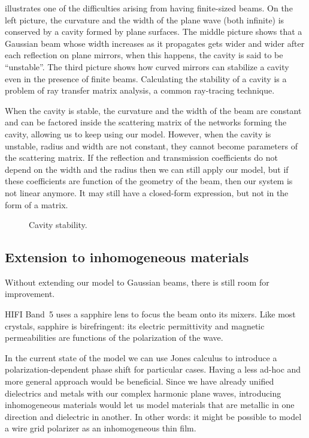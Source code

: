 \begin{refsection}
 illustrates one of the difficulties arising from having finite-sized beams.
On the left picture, the curvature and the width of the plane wave (both infinite) is conserved by a cavity formed by plane surfaces.
The middle picture shows that a Gaussian beam whose width increases as it propagates gets wider and wider after each reflection on plane mirrors, when this happens, the cavity is said to be ``unstable''.
The third picture shows how curved mirrors can stabilize a cavity even in the presence of finite beams.
Calculating the stability of a cavity is a problem of ray transfer matrix analysis, a common ray-tracing technique.

When the cavity is stable, the curvature and the width of the beam are constant and can be factored inside the scattering matrix of the networks forming the cavity, allowing us to keep using our model.
However, when the cavity is unstable, radius and width are not constant, they cannot become parameters of the scattering matrix.
If the reflection and transmission coefficients do not depend on the width and the radius then we can still apply our model, but if these coefficients are function of the geometry of the beam, then our system is not linear anymore.
It may still have a closed-form expression, but not in the form of a matrix.

\begin{figure}
    \centering
    \footnotesize
    
    \caption{Cavity stability.}
    \label{fig:cavity_stability}
\end{figure}

\subsection{Extension to inhomogeneous materials}
Without extending our model to Gaussian beams, there is still room for improvement.

HIFI Band~5 uses a sapphire lens to focus the beam onto its mixers.
Like most crystals, sapphire is birefringent: its electric permittivity and magnetic permeabilities are functions of the polarization of the wave.

In the current state of the model we can use Jones calculus to introduce a polarization-dependent phase shift for particular cases.
Having a less ad-hoc and more general approach would be beneficial.
Since we have already unified dielectrics and metals with our complex harmonic plane waves, introducing inhomogeneous materials would let us model materials that are metallic in one direction and dielectric in another.
In other words: it might be possible to model a wire grid polarizer as an inhomogeneous thin film.


\end{refsection}
